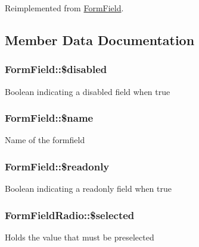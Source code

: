 Reimplemented from \hyperlink{classFormField_a465ff61e290d82be96bb793c3a14b3e7}{FormField}.



\subsection{Member Data Documentation}
\subsubsection[{\$disabled}]{\setlength{\rightskip}{0pt plus 5cm}FormField::\$disabled}\label{classFormField_ab6f1907061890290e32cb2befc0a5f50}
Boolean indicating a disabled field when true 
\subsubsection[{\$name}]{\setlength{\rightskip}{0pt plus 5cm}FormField::\$name}\label{classFormField_a23861f707bcd77bbace6300de9621746}
Name of the formfield 
\subsubsection[{\$readonly}]{\setlength{\rightskip}{0pt plus 5cm}FormField::\$readonly}\label{classFormField_a78ba5d4b9127e75e8ccf86f397b5d9ac}
Boolean indicating a readonly field when true 
\subsubsection[{\$selected}]{\setlength{\rightskip}{0pt plus 5cm}FormFieldRadio::\$selected}\label{classFormFieldRadio_a1b6abf4c527efabf94d2b5147492007e}
Holds the value that must be preselected 
